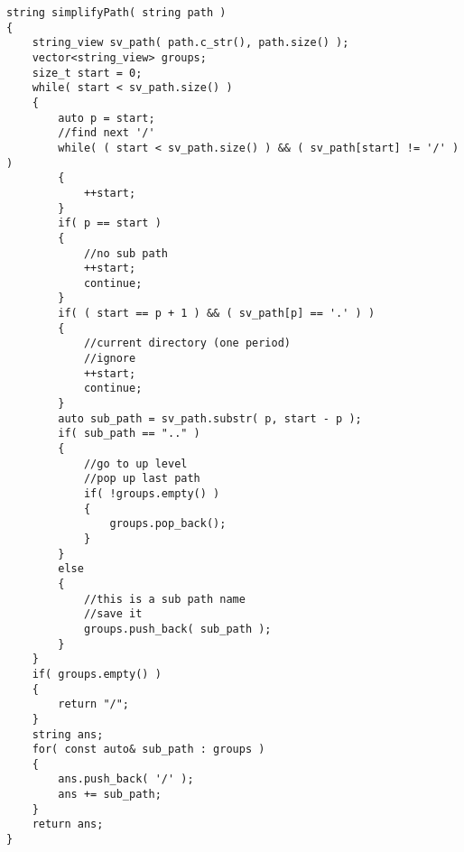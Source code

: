 \setcounter{lstlisting}{0}
\begin{lstlisting}[style=customc, caption={Stack}]
string simplifyPath( string path )
{
    string_view sv_path( path.c_str(), path.size() );
    vector<string_view> groups;
    size_t start = 0;
    while( start < sv_path.size() )
    {
        auto p = start;
        //find next '/'
        while( ( start < sv_path.size() ) && ( sv_path[start] != '/' ) )
        {
            ++start;
        }
        if( p == start )
        {
            //no sub path
            ++start;
            continue;
        }
        if( ( start == p + 1 ) && ( sv_path[p] == '.' ) )
        {
            //current directory (one period)
            //ignore
            ++start;
            continue;
        }
        auto sub_path = sv_path.substr( p, start - p );
        if( sub_path == ".." )
        {
            //go to up level
            //pop up last path
            if( !groups.empty() )
            {
                groups.pop_back();
            }
        }
        else
        {
            //this is a sub path name
            //save it
            groups.push_back( sub_path );
        }
    }
    if( groups.empty() )
    {
        return "/";
    }
    string ans;
    for( const auto& sub_path : groups )
    {
        ans.push_back( '/' );
        ans += sub_path;
    }
    return ans;
}
\end{lstlisting}